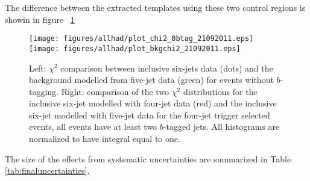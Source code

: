 The difference between the extracted templates using these two control regions is showin in figure ~\ref{fig:chi2.eps}
\begin{figure}[h!]
  \begin{center}
    \texttt{[image: figures/allhad/plot\_chi2\_0btag\_21092011.eps]} 
    \texttt{[image: figures/allhad/plot\_bkgchi2\_21092011.eps]}\\
  \end{center}
  \caption{Left: $\chi^2$ comparison between inclusive six-jets data (dots) and the background modelled from five-jet data (green) for events without $b$-tagging. Right: comparison of the two $\chi^2$ distributions for the inclusive six-jet modelled with four-jet data (red) and the inclusive six-jet modelled with five-jet data for the four-jet trigger selected events, all events have at least two $b$-tagged jets. All histograms are normalized to have integral equal to one.}
  \label{fig:chi2.eps}
\end{figure} 

The size of the effects from systematic uncertainties are summarized in Table \ref{tab:finaluncertainties}.

